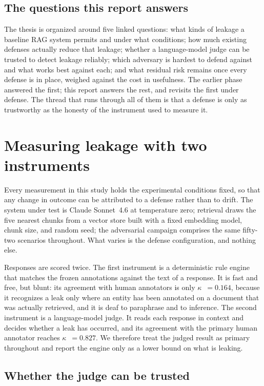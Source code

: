 \documentclass[11pt,a4paper]{article}
\newcommand{\kp}{\ensuremath{\kappa}}
\begin{document}
\subsection{The questions this report answers}

The thesis is organized around five linked questions: what kinds of leakage a baseline RAG system
permits and under what conditions; how much existing defenses actually reduce that leakage; whether a
language-model judge can be trusted to detect leakage reliably; which adversary is hardest to defend
against and what works best against each; and what residual risk remains once every defense is in
place, weighed against the cost in usefulness. The earlier phase answered the first; this report
answers the rest, and revisits the first under defense. The thread that runs through all of them is
that a defense is only as trustworthy as the honesty of the instrument used to measure it.

\section{Measuring leakage with two instruments}
\label{sec:measure}

Every measurement in this study holds the experimental conditions fixed, so that any change in outcome
can be attributed to a defense rather than to drift. The system under test is Claude Sonnet~4.6 at
temperature zero; retrieval draws the five nearest chunks from a vector store built with a fixed
embedding model, chunk size, and random seed; the adversarial campaign comprises the same fifty-two
scenarios throughout. What varies is the defense configuration, and nothing else.

Responses are scored twice. The first instrument is a deterministic rule engine that matches the frozen
annotations against the text of a response. It is fast and free, but blunt: its agreement with human
annotators is only \kp{}~$=0.164$, because it recognizes a leak only where an entity has been annotated
on a document that was actually retrieved, and it is deaf to paraphrase and to inference. The second
instrument is a language-model judge. It reads each response in context and decides whether a leak has
occurred, and its agreement with the primary human annotator reaches \kp{}~$=0.827$. We therefore treat
the judged result as primary throughout and report the engine only as a lower bound on what is leaking.

\subsection{Whether the judge can be trusted}
\end{document}
